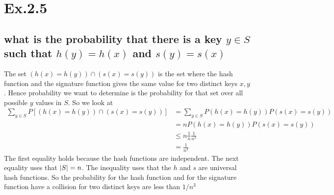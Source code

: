 \section*{Ex.2.5}
\subsection*{what is the probability that there is a key $y \in S$ such that $h(y) = h(x)$ and $s(y) = s(x)$}
The set $(h(x)=h(y))\cap(s(x)=s(y))$ is the set where the hash function and the signature function gives the same value for two distinct keys $x,y$. Hence probability we want to determine is the probability for that set over all possible $y$ values in $S$. So we look at
\begin{align*}
\sum_{y\in S}P[(h(x)=h(y))\cap(s(x)=s(y))] 
             &= \sum_{y\in S}P(h(x)=h(y))P(s(x)=s(y))\\
             &= nP(h(x)=h(y))P(s(x)=s(y))\\
             &\leq n\frac{1}{n}\frac{1}{n^3}\\
             &= \frac{1}{n^3}
\end{align*}
The first equality holds because the hash functions are independent. The next equality uses that $\lvert S\rvert=n$. The inequality uses that the $h$ and $s$ are universal hash functions. So the probability for the hash function and for the signature function have a collision for two distinct keys are less than $1/n^3$